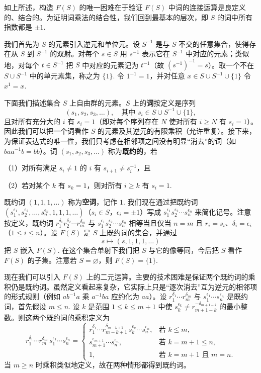 如上所述，构造 \(F(S)\) 的唯一困难在于验证 \(F(S)\) 中词的连接运算是良定义的、结合的。为证明词乘法的结合性，我们回到最基本的层次，即 \(S\) 的词中所有指数都是 \(\pm 1\).

我们首先为 \(S\) 的元素引入逆元和单位元。设 \(S^{-1}\) 是与 \(S\) 不交的任意集合，使得存在从 \(S\) 到 \(S^{-1}\) 的双射。对每个 \(s \in S\) 用 \(s^{-1}\) 表示它在 \(S^{-1}\) 中对应的元素；类似地，对每个 \(t \in S^{-1}\) 把 \(S\) 中对应的元素记为 \(t^{-1}\)（故 \((s^{-1})^{-1} = s\)）。取一个不在 \(S \cup S^{-1}\) 中的单元素集，称之为 \(\{1\}\). 令 \(1^{-1} = 1\)，并对任意 \(x \in S \cup S^{-1} \cup \{1\}\) 令 \(x^1 = x\).

下面我们描述集合 \(S\) 上自由群的元素。\(S\) 上的\textbf{词}按定义是序列
\[
(s_1, s_2, s_3, \ldots), \quad \text{其中 } s_i \in S \cup S^{-1} \cup \{1\},
\]
且对所有充分大的 \(i\) 有 \(s_i = 1\)（即对每个序列存在 \(N\) 使对所有 \(i \geq N\) 有 \(s_i = 1\)）。因此我们可以把一个词看作 \(S\) 的元素及其逆元的有限乘积（允许重复）。接下来，为保证表达式的唯一性，我们只考虑在相邻项之间没有明显“消去”的词（如 \(baa^{-1}b = bb\)）。词 \((s_1, s_2, s_3, \ldots)\) 称为\textbf{既约的}，若

（1）对所有满足 \(s_i \neq 1\) 的 \(i\) 有 \(s_{i+1} \neq s_i^{-1}\)，且

（2）若对某个 \(k\) 有 \(s_k = 1\)，则对所有 \(i \geq k\) 有 \(s_i = 1\).

既约词 \((1, 1, 1, \ldots)\) 称为\textbf{空词}，记作 \(1\). 我们现在通过把既约词 \((s_1^{\epsilon_1}, s_2^{\epsilon_2}, \ldots, s_n^{\epsilon_n}, 1, 1, 1, \ldots)\)（\(s_i \in S\)，\(\epsilon_i = \pm 1\)）写成 \(s_1^{\epsilon_1}s_2^{\epsilon_2}\cdots s_n^{\epsilon_n}\) 来简化记号。注意按定义，既约词 \(r_1^{\delta_1}r_2^{\delta_2}\cdots r_m^{\delta_m}\) 与 \(s_1^{\epsilon_1}s_2^{\epsilon_2}\cdots s_n^{\epsilon_n}\) 相等当且仅当 \(n = m\) 且 \(r_i = s_i\)、\(\delta_i = \epsilon_i\)（\(1 \leq i \leq n\)）。设 \(F(S)\) 是 \(S\) 上既约词的集合，并通过
\[
s \mapsto (s, 1, 1, 1, \ldots)
\]
把 \(S\) 嵌入 \(F(S)\). 在这个集合单射下我们把 \(S\) 与它的像等同，今后把 \(S\) 看作 \(F(S)\) 的子集。注意若 \(S = \varnothing\)，则 \(F(S) = \{1\}\).

现在我们可以引入 \(F(S)\) 上的二元运算。主要的技术困难是保证两个既约词的乘积仍是既约词。虽然定义看起来复杂，它实际上只是“逐次消去”互为逆元的相邻项的形式规则（例如 \(ab^{-1}a\) 乘 \(a^{-1}ba\) 应约化为 \(aa\)）。设 \(r_1^{\delta_1}\cdots r_m^{\delta_m}\) 与 \(s_1^{\epsilon_1}\cdots s_n^{\epsilon_n}\) 是既约词，首先假设 \(m \leq n\). 设 \(k\) 是范围 \(1 \leq k \leq m+1\) 中使 \(s_k^{\epsilon_k} \neq r_{m+1-k}^{-\delta_{m+1-k}}\) 的最小整数。则这两个既约词的乘积定义为
\[
r_1^{\delta_1}\cdots r_m^{\delta_m}\, s_1^{\epsilon_1}\cdots s_n^{\epsilon_n} =
\begin{cases}
r_1^{\delta_1}\cdots r_{m-k+1}^{\delta_{m-k+1}}\, s_k^{\epsilon_k}\cdots s_n^{\epsilon_n}, & \text{若 } k \leq m, \\[2pt]
s_{m+1}^{\epsilon_{m+1}}\cdots s_n^{\epsilon_n}, & \text{若 } k = m+1 \leq n, \\[2pt]
1, & \text{若 } k = m+1 \text{ 且 } m = n.
\end{cases}
\]
当 \(m \geq n\) 时乘积类似地定义，故在两种情形都得到既约词。

